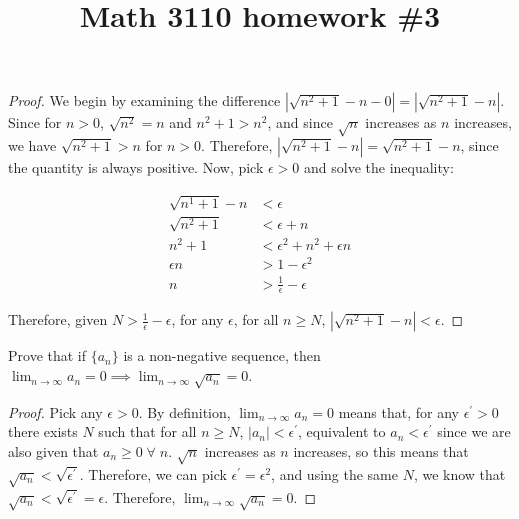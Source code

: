 

\title{Math 3110 homework \#3}
\author{\name}
\maketitle


\begin{proof}
  We begin by examining the difference $|\sqrt{n^2 + 1} - n - 0| = |\sqrt{n^2 + 1} - n|$. Since for $n > 0$, $\sqrt{n^2} = n$ and $n^2 + 1 > n^2$, and since $\sqrt{n}$ increases as $n$ increases, we have $\sqrt{n^2 + 1} > n$ for $n > 0$. Therefore, $|\sqrt{n^2 + 1} - n| = \sqrt{n^2 + 1} - n$, since the quantity is always positive. Now, pick $\epsilon > 0$ and solve the inequality:

  \begin{align*}
    \sqrt{n^1 + 1} - n &< \epsilon \\
    \sqrt{n^2 + 1} &< \epsilon + n \\
    n^2 + 1 &< \epsilon^2 + n^2 + \epsilon n \\
    \epsilon n &> 1 - \epsilon^2 \\
    n &> \frac{1}{\epsilon} - \epsilon
  \end{align*}

  Therefore, given $N > \frac{1}{\epsilon} - \epsilon$, for any $\epsilon$, for all $n \geq N$, $|\sqrt{n^2 + 1} - n| < \epsilon$.
\end{proof}

Prove that if $\{a_n\}$ is a non-negative sequence, then $\lim_{n \rightarrow \infty} a_n = 0 \implies \lim_{n \rightarrow \infty} \sqrt{a_n} = 0$.

\begin{proof}
  Pick any $\epsilon > 0$. By definition, $\lim_{n \rightarrow \infty} a_n = 0$ means that, for any $\epsilon^{\prime} > 0$ there exists $N$ such that for all $n \geq N$, $|a_n| < \epsilon^{\prime}$, equivalent to $a_n < \epsilon^{\prime}$ since we are also given that $a_n \geq 0 \;\forall\; n$. $\sqrt{n}$ increases as $n$ increases, so this means that $\sqrt{a_n} < \sqrt{\epsilon^{\prime}}$. Therefore, we can pick $\epsilon^{\prime} = \epsilon^2$, and using the same $N$, we know that $\sqrt{a_n} < \sqrt{\epsilon^{\prime}} = \epsilon$. Therefore, $\lim_{n \rightarrow \infty} \sqrt{a_n} = 0$.
\end{proof}


